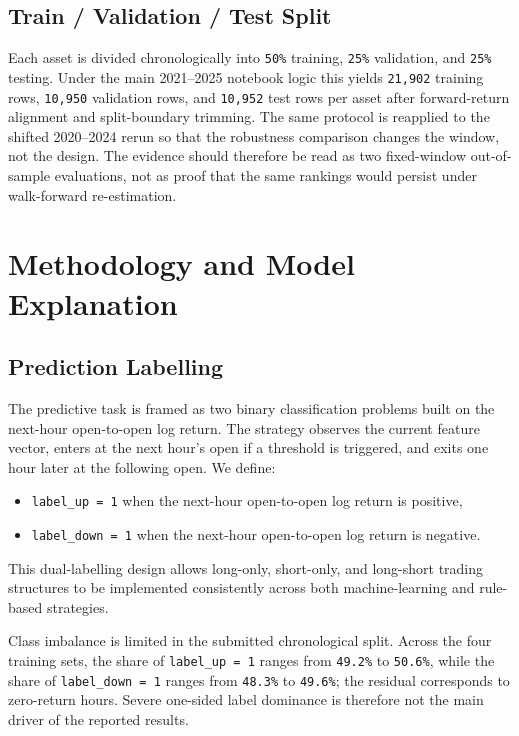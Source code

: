\documentclass[12pt]{article}
\begin{document}
\subsection{Train / Validation / Test Split}

Each asset is divided chronologically into \texttt{50\%} training, \texttt{25\%} validation, and \texttt{25\%} testing. Under the main 2021--2025 notebook logic this yields \texttt{21,902} training rows, \texttt{10,950} validation rows, and \texttt{10,952} test rows per asset after forward-return alignment and split-boundary trimming. The same protocol is reapplied to the shifted 2020--2024 rerun so that the robustness comparison changes the window, not the design. The evidence should therefore be read as two fixed-window out-of-sample evaluations, not as proof that the same rankings would persist under walk-forward re-estimation.

\section{Methodology and Model Explanation}

\subsection{Prediction Labelling}

The predictive task is framed as two binary classification problems built on the next-hour open-to-open log return. The strategy observes the current feature vector, enters at the next hour’s open if a threshold is triggered, and exits one hour later at the following open. We define:

\begin{itemize}
    \item \texttt{label\_up = 1} when the next-hour open-to-open log return is positive,
    \item \texttt{label\_down = 1} when the next-hour open-to-open log return is negative.
\end{itemize}

This dual-labelling design allows long-only, short-only, and long-short trading structures to be implemented consistently across both machine-learning and rule-based strategies.

Class imbalance is limited in the submitted chronological split. Across the four training sets, the share of \texttt{label\_up = 1} ranges from \texttt{49.2\%} to \texttt{50.6\%}, while the share of \texttt{label\_down = 1} ranges from \texttt{48.3\%} to \texttt{49.6\%}; the residual corresponds to zero-return hours. Severe one-sided label dominance is therefore not the main driver of the reported results.
\end{document}
